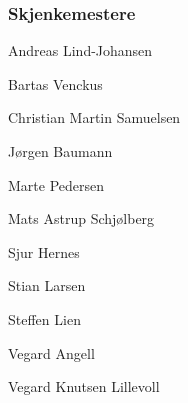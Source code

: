 {\begin{minipage}{0.6\textwidth}
\subsubsection*{Skjenkemestere}

\begin{description}
	\item Andreas Lind-Johansen
	\item Bartas Venckus
	\item Christian Martin Samuelsen
	\item Jørgen Baumann
	\item Marte Pedersen
	\item Mats Astrup Schjølberg
	\item Sjur Hernes
	\item Stian Larsen
	\item Steffen Lien
	\item Vegard Angell
	\item Vegard Knutsen Lillevoll
\end{description}
\end{minipage}
}



